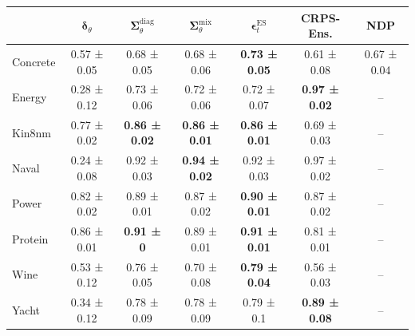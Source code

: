 \begin{tabular}{l|c|c|c|c|c|c}
\toprule
 & $\bm\delta_\theta$ & $\bm\Sigma_\theta^{\mathrm{diag}}$ & $\bm\Sigma_\theta^{\mathrm{mix}}$ & $\bm\epsilon_t^\mathrm{ES}$ & CRPS-Ens. & NDP \\
\midrule
Concrete & 0.57 ± 0.05 & 0.68 ± 0.05 & 0.68 ± 0.06 & \textbf{0.73 ± 0.05} & 0.61 ± 0.08 & 0.67 ± 0.04 \\
Energy & 0.28 ± 0.12 & 0.73 ± 0.06 & 0.72 ± 0.06 & 0.72 ± 0.07 & \textbf{0.97 ± 0.02} & -- \\
Kin8nm & 0.77 ± 0.02 & \textbf{0.86 ± 0.02} & \textbf{0.86 ± 0.01} & \textbf{0.86 ± 0.01} & 0.69 ± 0.03 & -- \\
Naval & 0.24 ± 0.08 & 0.92 ± 0.03 & \textbf{0.94 ± 0.02} & 0.92 ± 0.03 & 0.97 ± 0.02 & -- \\
Power & 0.82 ± 0.02 & 0.89 ± 0.01 & 0.87 ± 0.02 & \textbf{0.90 ± 0.01} & 0.87 ± 0.02 & -- \\
Protein & 0.86 ± 0.01 & \textbf{0.91 ± 0} & 0.89 ± 0.01 & \textbf{0.91 ± 0.01} & 0.81 ± 0.01 & -- \\
Wine & 0.53 ± 0.12 & 0.76 ± 0.05 & 0.70 ± 0.08 & \textbf{0.79 ± 0.04} & 0.56 ± 0.03 & -- \\
Yacht & 0.34 ± 0.12 & 0.78 ± 0.09 & 0.78 ± 0.09 & 0.79 ± 0.1 & \textbf{0.89 ± 0.08} & -- \\
\bottomrule
\end{tabular}
